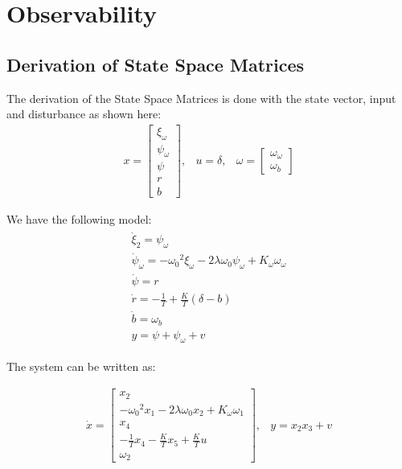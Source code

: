\newpage
\section{Observability}

\subsection{Derivation of State Space Matrices}
The derivation of the State Space Matrices is done with the state vector, input and disturbance as shown here:
\begin{equation}\label{state vector}
\begin{array}{ccc}
     x = \left[ {\begin{array}{*{20}{c}}
{{\xi _\omega }}\\
{{\psi _\omega }}\\
\psi \\
r\\
b
\end{array}} \right],&  
    u = \delta  ,&  
    \omega  = \left[ {\begin{array}{*{20}{c}}
    {{\omega _\omega }}\\
    {{\omega _b}}
\end{array} }\right] 
\end{array}
\end{equation}

We have the following model:
\begin{align}
    \begin{array}{l}
{{\dot \xi }_2} = {\psi _\omega }\\
{{\dot \psi }_\omega } =  - {\omega _0}^2{\xi _\omega } - 2\lambda {\omega _0}{\psi _\omega } + {K_\omega }{\omega _\omega }\\
\dot \psi  = r\\
\dot r =  - \frac{1}{T} + \frac{K}{T}(\delta  - b)\\
\dot b = {\omega _b}\\
y = \psi  + {\psi _\omega } + v
\end{array}
\end{align}

The system can be written as:

\begin{equation}
\begin{array}{cc}
    \dot{x} = \left[ {\begin{array}{*{20}{c}}
{{x_2}}\\
{ - {\omega _0}^2{x_1} - 2\lambda {\omega _0}{x_2} + {K_\omega }{\omega _1}}\\
{{x_4}}\\
{ - \frac{1}{T}{x_4} - \frac{K}{T}{x_5} + \frac{K}{T}u}\\
{{\omega _2}}
\end{array}} \right] ,&  
    y = {x_2}{x_3} + v  
\end{array}
\end{equation}

